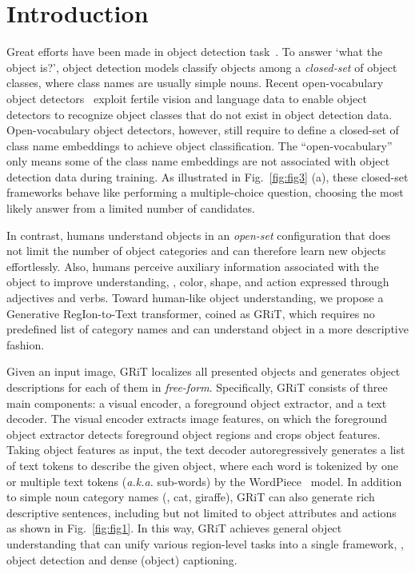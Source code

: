 \documentclass[10pt,twocolumn,letterpaper]{article}
\begin{document}
\section{Introduction}
\label{sec:intro}
Great efforts have been made in object detection task~\cite{ren2015faster,zhou2019objects,cai2018cascade,li2022exploring}. To answer `what the object is?', object detection models classify objects among a \emph{closed-set} of object classes, where class names are usually simple nouns. Recent open-vocabulary object detectors~\cite{zhong2022regionclip,zhou2022detecting,zareian2021open,gu2021open,gaoopen,li2022grounded} exploit fertile vision and language data to enable object detectors to recognize object classes that do not exist in object detection data. Open-vocabulary object detectors, however, still require to define a closed-set of class name embeddings to achieve object classification. The ``open-vocabulary'' only means some of the class name embeddings are not associated with object detection data during training. As illustrated in Fig.~\ref{fig:fig3} (a), these closed-set frameworks behave like performing a multiple-choice question, choosing the most likely answer from a limited number of candidates.

In contrast, humans understand objects in an \emph{open-set} configuration that does not limit the number of object categories and can therefore learn new objects effortlessly. Also, humans perceive auxiliary information associated with the object to improve understanding, \eg, color, shape, and action expressed through adjectives and verbs. Toward human-like object understanding, we propose a Generative RegIon-to-Text transformer, coined as GRiT, which requires no predefined list of category names and can understand object in a more descriptive fashion. 

Given an input image, GRiT localizes all presented objects and generates object descriptions for each of them in \emph{free-form}. Specifically, GRiT consists of three main components: a visual encoder, a foreground object extractor, and a text decoder. The visual encoder extracts image features, on which the foreground object extractor detects foreground object regions and crops object features. Taking object features as input, the text decoder autoregressively generates a list of text tokens to describe the given object, where each word is tokenized by one or multiple text tokens (\emph{a.k.a.} sub-words) by the WordPiece~\cite{wu2016google, schuster2012japanese} model. In addition to simple noun category names (\eg, cat, giraffe), GRiT can also generate rich descriptive sentences, including but not limited to object attributes and actions as shown in Fig.~\ref{fig:fig1}. In this way, GRiT achieves general object understanding that can unify various region-level tasks into a single framework, \eg, object detection and dense (object) captioning.
\end{document}
